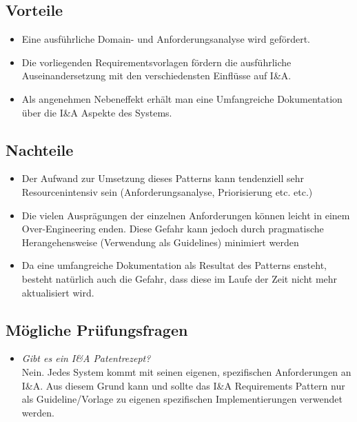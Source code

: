 \subsection*{Vorteile}
\begin{itemize}
	\item Eine ausführliche Domain- und Anforderungsanalyse wird gefördert.
	\item Die vorliegenden Requirementsvorlagen fördern die ausführliche Auseinandersetzung mit den verschiedensten Einflüsse auf I\&A.
	\item Als angenehmen Nebeneffekt erhält man eine Umfangreiche Dokumentation über die I\&A Aspekte des Systems.
\end{itemize}

\subsection*{Nachteile}
\begin{itemize}
	\item Der Aufwand zur Umsetzung dieses Patterns kann tendenziell sehr Resourcenintensiv sein (Anforderungsanalyse, Priorisierung etc. etc.)
	\item Die vielen Ausprägungen der einzelnen Anforderungen können leicht in einem Over-Engineering enden. Diese Gefahr kann jedoch durch pragmatische Herangehensweise (Verwendung als Guidelines) minimiert werden
	\item Da eine umfangreiche Dokumentation als Resultat des Patterns ensteht, besteht natürlich auch die Gefahr, dass diese im Laufe der Zeit nicht mehr aktualisiert wird.
\end{itemize}

\subsection*{Mögliche Prüfungsfragen}
\begin{itemize}
	\item \emph{Gibt es ein I\&A Patentrezept?}\\
	Nein. Jedes System kommt mit seinen eigenen, spezifischen Anforderungen an I\&A. Aus diesem Grund kann und sollte das I\&A Requirements Pattern nur als Guideline/Vorlage zu eigenen spezifischen Implementierungen verwendet werden.
\end{itemize}